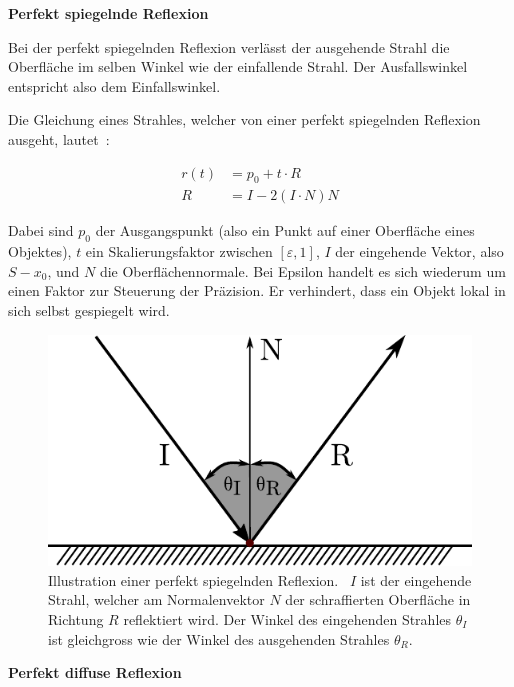 \textbf{Perfekt spiegelnde Reflexion}

Bei der perfekt spiegelnden Reflexion verlässt der ausgehende Strahl die
Oberfläche im selben Winkel wie der einfallende Strahl. Der
Ausfallswinkel entspricht also dem Einfallswinkel.

Die Gleichung eines Strahles, welcher von einer perfekt spiegelnden
Reflexion ausgeht, lautet~\parencite[S. 132]{glassner_introduction_1989}:

\begin{align}
    r(t) &= p_{0} + t \cdot R \\
    R &= I - 2(I \cdot N)N
\end{align}

Dabei sind $p_{0}$ der Ausgangspunkt (also ein Punkt auf einer Oberfläche
eines Objektes), $t$ ein Skalierungsfaktor zwischen $[\varepsilon, 1]$, $I$
der eingehende Vektor, also $S - x_{0}$, und $N$ die Oberflächennormale.
Bei Epsilon handelt es sich wiederum um einen Faktor zur Steuerung
der Präzision. Er verhindert, dass ein Objekt lokal in sich selbst
gespiegelt wird.

\begin{figure}[H]\label{fig:ray_tracing_specular_reflection}
    \centering
    \includegraphics{img/perfect_specular_reflection.pdf}
    \caption{Illustration einer perfekt spiegelnden
        Reflexion.~\protect\footnotemark{}
        $I$ ist der eingehende Strahl, welcher am Normalenvektor $N$ der
        schraffierten Oberfläche in Richtung $R$ reflektiert wird. Der
        Winkel des eingehenden Strahles $\theta_{I}$ ist gleichgross wie der
        Winkel des ausgehenden Strahles $\theta_{R}$.}
\end{figure}

\textbf{Perfekt diffuse Reflexion}

